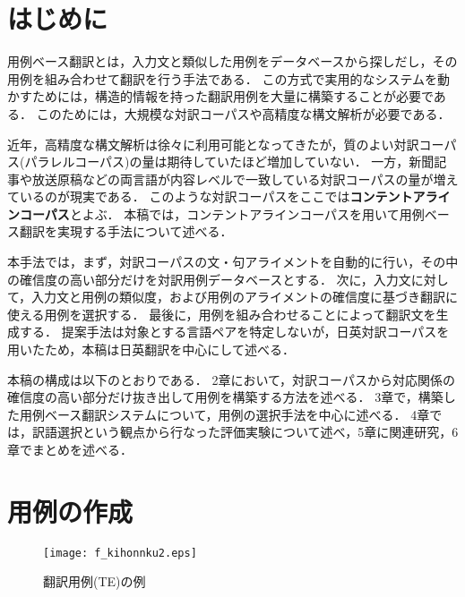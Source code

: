 \documentclass{nlp}
\begin{document}
\maketitle

\section{はじめに}

用例ベース翻訳\cite{Nagao1984}とは，入力文と類似した用例をデータベースから探しだし，その用例を組み合わせて翻訳を行う手法である．
この方式で実用的なシステムを動かすためには，構造的情報を持った翻訳用例を大量に構築することが必要である．
このためには，大規模な対訳コーパスや高精度な構文解析が必要である．

近年，高精度な構文解析は徐々に利用可能となってきたが，質のよい対訳コーパス(パラレルコーパス)の量は期待していたほど増加していない．
一方，新聞記事や放送原稿などの両言語が内容レベルで一致している対訳コーパスの量が増えているのが現実である．
このような対訳コーパスをここでは\textbf{コンテントアラインコーパス}とよぶ．
本稿では，コンテントアラインコーパスを用いて用例ベース翻訳を実現する手法について述べる．

本手法では，まず，対訳コーパスの文・句アライメントを自動的に行い，その中の確信度の高い部分だけを対訳用例データベースとする．
次に，入力文に対して，入力文と用例の類似度，および用例のアライメントの確信度に基づき翻訳に使える用例を選択する．
最後に，用例を組み合わせることによって翻訳文を生成する．
提案手法は対象とする言語ペアを特定しないが，日英対訳コーパスを用いたため，本稿は日英翻訳を中心にして述べる．

本稿の構成は以下のとおりである．
2章において，対訳コーパスから対応関係の確信度の高い部分だけ抜き出して用例を構築する方法を述べる．
3章で，構築した用例ベース翻訳システムについて，用例の選択手法を中心に述べる．
4章では，訳語選択という観点から行なった評価実験について述べ，5章に関連研究，6章でまとめを述べる．

\section{用例の作成}

\begin{figure}
\begin{center}
\texttt{[image: f\_kihonnku2.eps]}
\end{center}
\caption{翻訳用例(TE)の例}
\label{f_kihonnku2.eps}
\end{figure}
\end{document}
